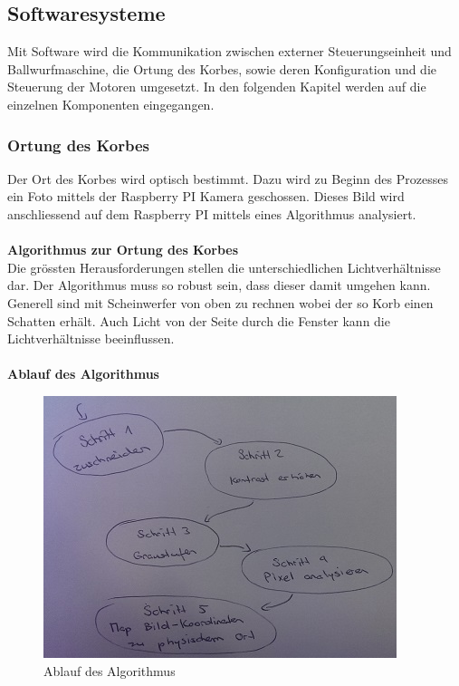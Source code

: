 \subsection{Softwaresysteme}
Mit Software wird die Kommunikation zwischen externer Steuerungseinheit und Ballwurfmaschine, die Ortung des Korbes, sowie deren Konfiguration und die Steuerung der Motoren umgesetzt. In den folgenden Kapitel werden auf die einzelnen Komponenten eingegangen.

\subsubsection{Ortung des Korbes}
Der Ort des Korbes wird optisch bestimmt. Dazu wird zu Beginn des Prozesses ein Foto mittels der Raspberry PI Kamera geschossen. Dieses Bild wird anschliessend auf dem Raspberry PI mittels eines Algorithmus analysiert.\\
\\
\textbf{Algorithmus zur Ortung des Korbes}\\
Die grössten Herausforderungen stellen die unterschiedlichen Lichtverhältnisse dar. Der Algorithmus muss so robust sein, dass dieser damit umgehen kann. Generell sind mit Scheinwerfer von oben zu rechnen wobei der so Korb einen Schatten erhält. Auch Licht von der Seite durch die Fenster kann die Lichtverhältnisse beeinflussen.\\
\\
\textbf{Ablauf des Algorithmus}\\
\begin{figure}[h!]
	\centering
	\includegraphics[scale=0.75]{../../fig/ablauf-algorithmus-orts-erkennung.jpg}
	\caption{Ablauf des Algorithmus}
\end{figure}

